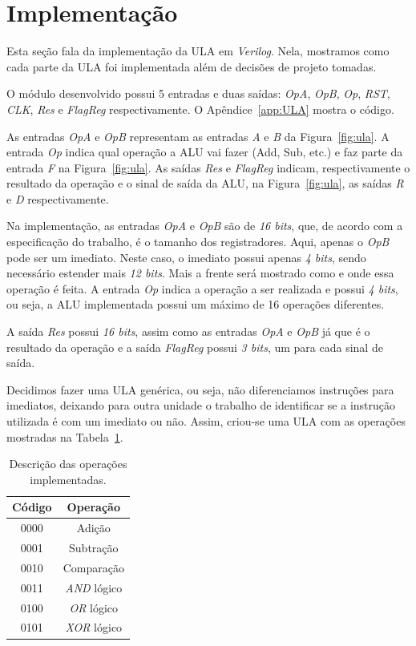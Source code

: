 \documentclass[11pt,a4paper,titlepage]{article}
\begin{document}
\section{Implementação}

Esta seção fala da implementação da ULA em \textit{Verilog}.
Nela, mostramos como cada parte da ULA foi implementada além de decisões de projeto tomadas.

O módulo desenvolvido possui 5 entradas e duas saídas: \textit{OpA}, \textit{OpB}, \textit{Op}, \textit{RST}, \textit{CLK}, \textit{Res} e \textit{FlagReg} respectivamente.
O Apêndice~\ref{app:ULA} mostra o código.

As entradas \textit{OpA} e \textit{OpB} representam as entradas \textit{A} e \textit{B} da Figura~\ref{fig:ula}.
A entrada \textit{Op} indica qual operação a ALU vai fazer (Add, Sub, etc.) e faz parte da entrada \textit{F} na Figura~\ref{fig:ula}.
As saídas \textit{Res} e \textit{FlagReg} indicam, respectivamente o resultado da operação e o sinal de saída da ALU, na Figura~\ref{fig:ula}, as saídas \textit{R} e \textit{D} respectivamente.

Na implementação, as entradas \textit{OpA} e \textit{OpB} são de \textit{16 bits}, que, de acordo com a especificação do trabalho, é o tamanho dos registradores.
Aqui, apenas o \textit{OpB} pode ser um imediato.
Neste caso, o imediato possui apenas \textit{4 bits}, sendo necessário estender mais \textit{12 bits}.
Mais a frente será mostrado como e onde essa operação é feita.
A entrada \textit{Op} indica a operação a ser realizada e possui \textit{4 bits}, ou seja, a ALU implementada possui um máximo de 16 operações diferentes.

A saída \textit{Res} possui \textit{16 bits}, assim como as entradas \textit{OpA} e \textit{OpB} já que é o resultado da operação e a saída \textit{FlagReg} possui \textit{3 bits}, um para cada sinal de saída.

Decidimos fazer uma ULA genérica, ou seja, não diferenciamos instruções para imediatos, deixando para outra unidade o trabalho de identificar se a instrução utilizada é com um imediato ou não.
Assim, criou-se uma ULA com as operações mostradas na Tabela~\ref{tab:imp}.

\begin{table}[h]
\centering
\begin{tabular}{| c | c |}
\hline
Código  & Operação \\
\hline
0000 & Adição\\
\hline
0001 & Subtração\\
\hline
0010 & Comparação\\
\hline
0011 & \textit{AND} lógico\\
\hline
0100 & \textit{OR} lógico\\
\hline
0101 & \textit{XOR} lógico\\
\hline
\end{tabular}
\caption{Descrição das operações implementadas.}
\label{tab:imp}
\end{table}
%
\end{document}
